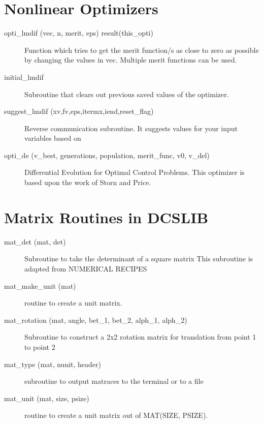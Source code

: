 \section{Nonlinear Optimizers}
\label{r:opti}      

\begin{description}

\item[opti\_lmdif (vec, n, merit, eps) result(this\_opti)] \Newline 
     Function which tries to get the merit function/s as close to zero as possible
     by changing the values in vec. Multiple merit functions can be used.

\item[initial\_lmdif] \Newline 
     Subroutine that clears out previous saved values of the optimizer.

\item[suggest\_lmdif (xv,fv,eps,itermx,iend,reset\_flag)] \Newline 
     Reverse communication subroutine. 
     It suggests values for your input variables based on

\item[opti\_de (v\_best, generations, population, merit\_func, v0, v\_del)] \Newline 
     Differential Evolution for Optimal Control Problems.
     This optimizer is based upon the work of Storn and Price. 

\end{description}

\section{Matrix Routines in DCSLIB}
\label{r:dcs_matrix}      

\begin{description}

\item[mat\_det (mat, det)] \Newline 
     Subroutine to take the determinant of a square matrix
     This subroutine is adapted from NUMERICAL RECIPES

\item[mat\_make\_unit (mat)] \Newline 
     routine to create a unit matrix.

\item[mat\_rotation (mat, angle, bet\_1, bet\_2, alph\_1, alph\_2)] \Newline 
     Subroutine to construct a 2x2 rotation matrix for translation from
     point 1 to point 2

\item[mat\_type (mat, nunit, header)] \Newline 
     subroutine to output matraces to the terminal or to a file

\item[mat\_unit (mat, size, psize)] \Newline 
     routine to create a unit matrix out of MAT(SIZE, PSIZE).

\end{description}

